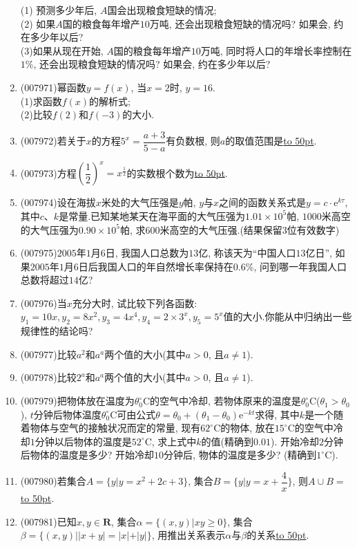 \documentclass[10pt,a4paper]{article}
\newcommand{\blank}[1]{\underline{\hbox to #1pt{}}}
\begin{document}
\begin{enumerate}[1.]
(1) 预测多少年后, $A$国会出现粮食短缺的情况;\\
(2) 如果$A$国的粮食每年增产$10$万吨, 还会出现粮食短缺的情况吗? 如果会, 约在多少年以后?\\
(3)如果从现在开始, $A$国的粮食每年增产$10$万吨, 同时将人口的年增长率控制在$1\%$, 还会出现粮食短缺的情况吗? 如果会, 约在多少年以后?
\item {\tiny (007971)}幂函数$y=f(x)$, 当$x=2$时, $y=16$.\\
(1)求函数$f(x)$的解析式;\\
(2)比较$f(2)$和$f(-3)$的大小.
\item {\tiny (007972)}若关于$x$的方程$5^x=\dfrac{a+3}{5-a}$有负数根, 则$a$的取值范围是\blank{50}.
\item {\tiny (007973)}方程$(\dfrac 12)^x=x^{\frac 12}$的实数根个数为\blank{50}.
\item {\tiny (007974)}设在海拔$x$米处的大气压强是$y$帕, $y$与$x$之间的函数关系式是$y=c\cdot \mathrm{e}^{k\tau}$, 其中$c$、$k$是常量.已知某地某天在海平面的大气压强为$1.01\times 10^5$帕, $1000$米高空的大气压强为$0.90\times 10^5$帕, 求$600$米高空的大气压强.(结果保留$3$位有效数字)
\item {\tiny (007975)}$2005$年$1$月$6$日, 我国人口总数为$13$亿, 称该天为``中国人口$13$亿日'', 如果$2005$年$1$月$6$日后我国人口的年自然增长率保持在$0.6\%$, 问到哪一年我国人口总数将超过$14$亿?
\item {\tiny (007976)}当$x$充分大时, 试比较下列各函数: $y_1=10x,y_2=8x^2,y_3=4x^4,y_4=2\times 3^x,y_5=5^x$值的大小.你能从中归纳出一些规律性的结论吗?
\item {\tiny (007977)}比较$a^2$和$a^a$两个值的大小(其中$a>0$, 且$a\ne 1$).
\item {\tiny (007978)}比较$2^a$和$a^a$两个值的大小(其中$a>0$, 且$a\ne 1$).
\item {\tiny (007979)}把物体放在温度为$\theta_0^\circ\text{C}$的空气中冷却, 若物体原来的温度是$\theta _0^\circ\text{C}$($\theta _1>\theta _0$), $t$分钟后物体温度$\theta _0^\circ\text{C}$可由公式$\theta =\theta _0+(\theta _1-\theta _0)\mathrm{e}^{-kt}$求得, 其中$k$是一个随着物体与空气的接触状况而定的常量, 现有$62^\circ\text{C}$的物体, 放在$15^\circ\text{C}$的空气中冷却$1$分钟以后物体的温度是$52^\circ\text{C}$, 求上式中$k$的值(精确到$0.01$). 开始冷却$2$分钟后物体的温度是多少? 开始冷却$10$分钟后, 物体的温度是多少? (精确到$1^\circ\text{C}$).
\item {\tiny (007980)}若集合$A=\{y|y=x^2+2c+3\}$, 集合$B=\{y|y=x+\dfrac 4x\}$, 则$A\cup B=$\blank{50}.
\item {\tiny (007981)}已知$x,y\in \mathbf{R}$, 集合$\alpha =\{(x,y)|xy\ge 0\}$, 集合$\beta =\{(x,y)||x+y|=|x|+|y|\}$, 用推出关系表示$\alpha$与$\beta$的关系\blank{50}.

\end{enumerate}
\end{document}

